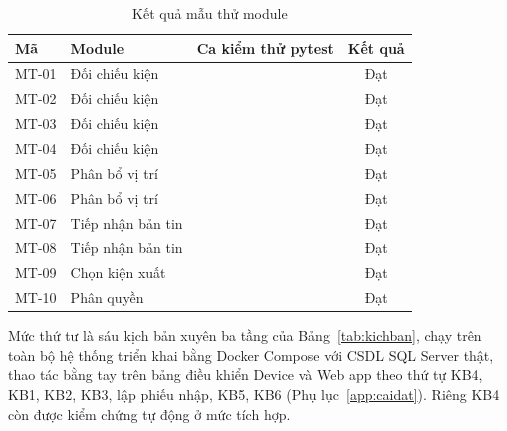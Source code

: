 \begin{table}[H]
\centering
\caption{Kết quả mẫu thử module}
\label{tab:kqmt}
\footnotesize
\begin{tabularx}{\textwidth}{l L{3.0cm} Y c}
\toprule
\textbf{Mã} & \textbf{Module} & \textbf{Ca kiểm thử pytest} & \textbf{Kết quả} \\
\midrule
MT-01 & Đối chiếu kiện &  & Đạt \\
MT-02 & Đối chiếu kiện &  & Đạt \\
MT-03 & Đối chiếu kiện &  & Đạt \\
MT-04 & Đối chiếu kiện &  & Đạt \\
MT-05 & Phân bổ vị trí &  & Đạt \\
MT-06 & Phân bổ vị trí &  & Đạt \\
MT-07 & Tiếp nhận bản tin &  & Đạt \\
MT-08 & Tiếp nhận bản tin &  & Đạt \\
MT-09 & Chọn kiện xuất &  & Đạt \\
MT-10 & Phân quyền &  & Đạt \\
\bottomrule
\end{tabularx}
\end{table}

Mức thứ tư là sáu kịch bản xuyên ba tầng của Bảng~\ref{tab:kichban}, chạy trên toàn bộ hệ thống triển khai bằng Docker Compose với CSDL SQL Server thật, thao tác bằng tay trên bảng điều khiển Device và Web app theo thứ tự KB4, KB1, KB2, KB3, lập phiếu nhập, KB5, KB6 (Phụ lục~\ref{app:caidat}). Riêng KB4 còn được kiểm chứng tự động ở mức tích hợp.

